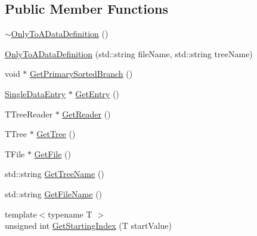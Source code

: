 \subsection*{Public Member Functions}
\begin{DoxyCompactItemize}
\item 
\hyperlink{classOnlyToADataDefinition_ac3392db2f04c84cfce35bbf12f287357}{$\sim$\+Only\+To\+A\+Data\+Definition} ()
\item 
\hyperlink{classOnlyToADataDefinition_aee47039c5d1c4c8714815e0253fca3e3}{Only\+To\+A\+Data\+Definition} (std\+::string file\+Name, std\+::string tree\+Name)
\item 
void $\ast$ \hyperlink{classOnlyToADataDefinition_af2025f39b59dc8bd50a281f5034ed47a}{Get\+Primary\+Sorted\+Branch} ()
\item 
\hyperlink{classSingleDataEntry}{Single\+Data\+Entry} $\ast$ \hyperlink{classOnlyToADataDefinition_ab2f4346c01cf342390c392cf1e36eebe}{Get\+Entry} ()
\item 
T\+Tree\+Reader $\ast$ \hyperlink{classRootDataDefinition_a48a885b44c954506728f71f07d927506}{Get\+Reader} ()
\item 
T\+Tree $\ast$ \hyperlink{classRootDataDefinition_a20ed89d6d2483a0f76cd2fb131fcc597}{Get\+Tree} ()
\item 
T\+File $\ast$ \hyperlink{classRootDataDefinition_ab26897ffdd1de5e6572f6067770066b3}{Get\+File} ()
\item 
std\+::string \hyperlink{classRootDataDefinition_acc7728b0a9315cacc6b9c1fae38ed490}{Get\+Tree\+Name} ()
\item 
std\+::string \hyperlink{classRootDataDefinition_a56f206839275fdf5af290b372c4d7e13}{Get\+File\+Name} ()
\item 
{\footnotesize template$<$typename T $>$ }\\unsigned int \hyperlink{classRootDataDefinition_a1d785995aed4450ddfa97c7064cc5dfc}{Get\+Starting\+Index} (T start\+Value)
\end{DoxyCompactItemize}
